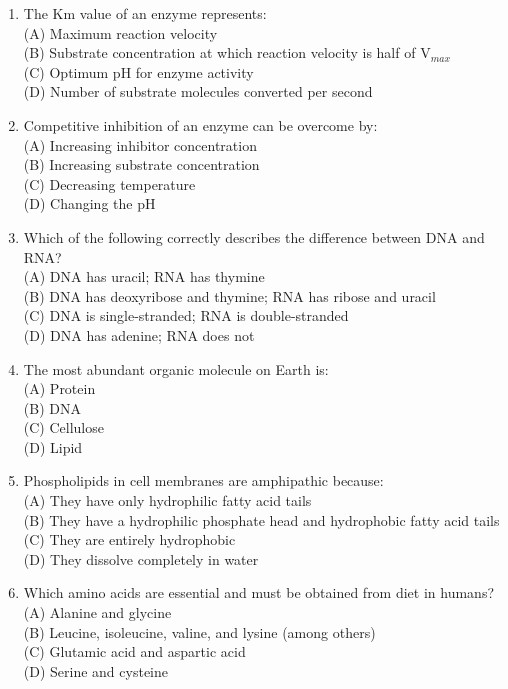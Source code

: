 \documentclass{article}
\begin{document}
\begin{enumerate}[label=Q\arabic*.]
\item The Km value of an enzyme represents:
\\(A) Maximum reaction velocity
\\(B) Substrate concentration at which reaction velocity is half of V$_{max}$
\\(C) Optimum pH for enzyme activity
\\(D) Number of substrate molecules converted per second

\item Competitive inhibition of an enzyme can be overcome by:
\\(A) Increasing inhibitor concentration
\\(B) Increasing substrate concentration
\\(C) Decreasing temperature
\\(D) Changing the pH

\item Which of the following correctly describes the difference between DNA and RNA?
\\(A) DNA has uracil; RNA has thymine
\\(B) DNA has deoxyribose and thymine; RNA has ribose and uracil
\\(C) DNA is single-stranded; RNA is double-stranded
\\(D) DNA has adenine; RNA does not

\item The most abundant organic molecule on Earth is:
\\(A) Protein
\\(B) DNA
\\(C) Cellulose
\\(D) Lipid

\item Phospholipids in cell membranes are amphipathic because:
\\(A) They have only hydrophilic fatty acid tails
\\(B) They have a hydrophilic phosphate head and hydrophobic fatty acid tails
\\(C) They are entirely hydrophobic
\\(D) They dissolve completely in water

\item Which amino acids are essential and must be obtained from diet in humans?
\\(A) Alanine and glycine
\\(B) Leucine, isoleucine, valine, and lysine (among others)
\\(C) Glutamic acid and aspartic acid
\\(D) Serine and cysteine


\end{enumerate}
\end{document}
